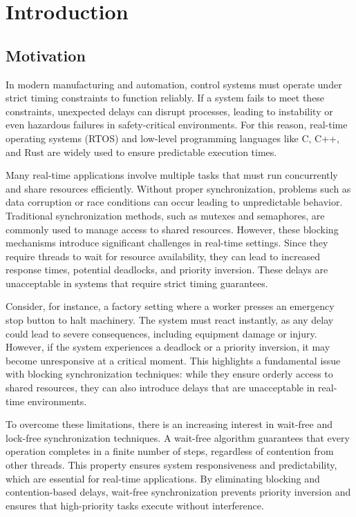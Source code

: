 \chapter{Introduction}

\section{Motivation}

In modern manufacturing and automation, control systems must operate under strict timing constraints to function reliably. If a system fails to meet these constraints, unexpected delays can disrupt processes, leading to instability or even hazardous failures in safety-critical environments. For this reason, real-time operating systems (RTOS) and low-level programming languages like C, C++, and Rust are widely used to ensure predictable execution times.

Many real-time applications involve multiple tasks that must run concurrently and share resources efficiently. Without proper synchronization, problems such as data corruption or race conditions can occur leading to unpredictable behavior. Traditional synchronization methods, such as mutexes and semaphores, are commonly used to manage access to shared resources. However, these blocking mechanisms introduce significant challenges in real-time settings. Since they require threads to wait for resource availability, they can lead to increased response times, potential deadlocks, and priority inversion. These delays are unacceptable in systems that require strict timing guarantees. \cite{herlihy1991wait, brandenburg2019multiprocessorrealtimelockingprotocols, kode2024analysisSynchronization}

Consider, for instance, a factory setting where a worker presses an emergency stop button to halt machinery. The system must react instantly, as any delay could lead to severe consequences, including equipment damage or injury. However, if the system experiences a deadlock or a priority inversion, it may become unresponsive at a critical moment. This highlights a fundamental issue with blocking synchronization techniques: while they ensure orderly access to shared resources, they can also introduce delays that are unacceptable in real-time environments.

To overcome these limitations, there is an increasing interest in wait-free and lock-free synchronization techniques. A wait-free algorithm guarantees that every operation completes in a finite number of steps, regardless of contention from other threads. This property ensures system responsiveness and predictability, which are essential for real-time applications. By eliminating blocking and contention-based delays, wait-free synchronization prevents priority inversion and ensures that high-priority tasks execute without interference. \cite{kogan2012methodology, herlihy1991wait}

